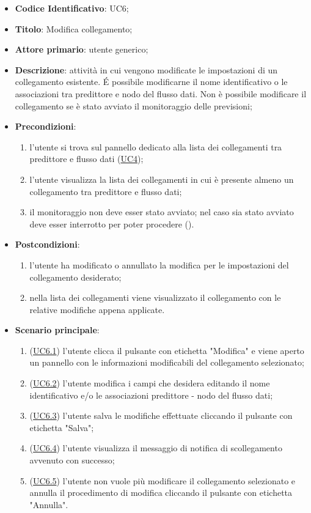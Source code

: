 		\begin{itemize}
			\item\textbf{Codice Identificativo}: UC6;
			\item\textbf{Titolo}: Modifica collegamento;
			\item\textbf{Attore primario}: utente generico;
			\item\textbf{Descrizione}: attività in cui vengono modificate le impostazioni di un collegamento esistente. \'E possibile modificarne il nome identificativo o le associazioni tra predittore e nodo del flusso dati. Non è possibile modificare il collegamento se è stato avviato il monitoraggio delle previsioni;
			\item\textbf{Precondizioni}:
			\begin{enumerate}
			\item l'utente si trova sul pannello dedicato alla lista dei collegamenti tra predittore e
flusso dati (\hyperref[par:UC4]{UC4});
			\item  l'utente visualizza la lista dei collegamenti in cui è presente almeno un collegamento tra predittore e flusso dati;	
			\item il monitoraggio non deve esser stato avviato; nel caso sia stato avviato deve esser interrotto per poter procedere ().
			\end{enumerate}
							
			\item\textbf{Postcondizioni}:
			\begin{enumerate}
				\item l'utente ha modificato o annullato la modifica per le impostazioni del collegamento desiderato;
				\item nella lista dei collegamenti viene visualizzato il collegamento con le relative modifiche appena applicate.			
			
			\end{enumerate}
				
			\item\textbf{Scenario principale}:
				\begin{enumerate}
				
				\item (\hyperref[par:UC6.1]{UC6.1}) l'utente clicca il pulsante con etichetta "Modifica" e viene aperto un pannello con le informazioni modificabili del collegamento selezionato;
				\item (\hyperref[par:UC6.2]{UC6.2}) l'utente modifica i campi che desidera editando il nome identificativo e/o  le associazioni predittore - nodo del flusso dati;
				\item (\hyperref[par:UC6.3]{UC6.3}) l'utente salva le modifiche effettuate cliccando il pulsante con etichetta "Salva";
				\item (\hyperref[par:UC6.4]{UC6.4}) l'utente visualizza il messaggio di notifica di scollegamento avvenuto con successo;
				\item (\hyperref[par:UC6.5]{UC6.5}) l'utente non vuole più modificare il collegamento selezionato e annulla il procedimento di modifica cliccando il pulsante con etichetta "Annulla".			
				\end{enumerate}		
				

\end{itemize}
